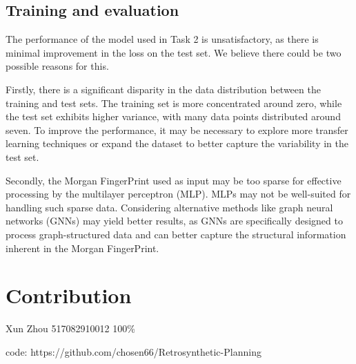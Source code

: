 \documentclass{article}
\begin{document}
\subsection{Training and evaluation}

The performance of the model used in Task 2 is unsatisfactory, as there is minimal improvement in the loss on the test set. We believe there could be two possible reasons for this.

Firstly, there is a significant disparity in the data distribution between the training and test sets. The training set is more concentrated around zero, while the test set exhibits higher variance, with many data points distributed around seven. To improve the performance, it may be necessary to explore more transfer learning techniques or expand the dataset to better capture the variability in the test set.

Secondly, the Morgan FingerPrint used as input may be too sparse for effective processing by the multilayer perceptron (MLP). MLPs may not be well-suited for handling such sparse data. Considering alternative methods like graph neural networks (GNNs) may yield better results, as GNNs are specifically designed to process graph-structured data and can better capture the structural information inherent in the Morgan FingerPrint.


\section{Contribution}

Xun Zhou 517082910012 100\%

code: https://github.com/chosen66/Retrosynthetic-Planning
\end{document}
